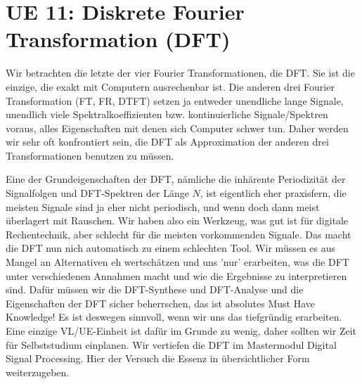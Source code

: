 \newpage
\section{UE 11: Diskrete Fourier Transformation (DFT)}
%
Wir betrachten die letzte der vier Fourier Transformationen, die DFT.
Sie ist die einzige, die exakt mit Computern ausrechenbar ist.
%
Die anderen drei Fourier Transformation (FT, FR, DTFT) setzen ja entweder
unendliche lange Signale, unendlich viele Spektralkoeffizienten bzw.
kontinuierliche Signale/Spektren
voraus, alles Eigenschaften mit denen sich Computer schwer tun.
%
Daher werden wir sehr oft konfrontiert sein, die DFT als Approximation
der anderen drei Transformationen benutzen zu müssen.
%

Eine der Grundeigenschaften der DFT, nämliche die inhärente
Periodizität der Signalfolgen und DFT-Spektren der Länge $N$, ist eigentlich
eher praxisfern, die meisten Signale sind ja eher nicht periodisch, und wenn
doch dann meist überlagert mit Rauschen.
%
Wir haben also ein Werkzeug, was gut ist für digitale Rechentechnik, aber
schlecht für die meisten vorkommenden Signale.
%
Das macht die DFT nun nich automatisch zu einem schlechten Tool. Wir müssen
es aus Mangel an Alternativen eh wertschätzen und uns 'nur' erarbeiten, was die
DFT unter verschiedenen Annahmen macht und wie die Ergebnisse zu interpretieren
sind.
%
Dafür müssen wir die DFT-Synthese und DFT-Analyse
und die Eigenschaften der DFT sicher beherrschen, das ist absolutes Must Have
Knowledge!
%
Es ist deswegen sinnvoll, wenn wir uns das tiefgründig erarbeiten. Eine einzige
VL/UE-Einheit ist dafür im Grunde zu wenig, daher sollten wir Zeit für
Selbststudium einplanen. Wir vertiefen die DFT im Mastermodul Digital Signal
Processing.
Hier der Versuch die Essenz in übersichtlicher Form weiterzugeben.

